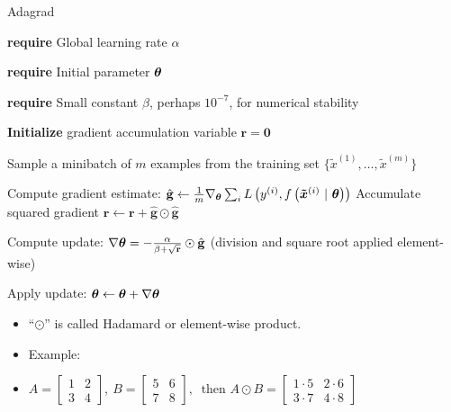 \documentclass[11pt,compress,t,notes=noshow, xcolor=table]{beamer}
\begin{document}
\begin{vbframe}{Adagrad}
	
	\begin{algorithm}[H]
		\small
		\caption{Adagrad}
		\begin{algorithmic}[1]
			\scriptsize 
			\State \textbf{require} Global learning rate $\alpha$ \strut
			\State \textbf{require} Initial parameter $\bm{\theta}$ \strut
			\State \textbf{require} Small constant $\beta$, perhaps $10^{-7}$, for numerical stability \strut
			\State \textbf{Initialize} gradient accumulation variable $\mathbf{r} = \mathbf{0} $
			\State \parbox[t]{\dimexpr\linewidth-\algorithmicindent}{Sample a minibatch of $m$ examples from the training set $\{\tilde{x}^{(1)},\dots,\tilde{x}^{(m)}\}$ \strut}
			\State Compute gradient estimate: $\hat{\mathbf{g}} \leftarrow \frac{1}{m} \nabla_{\bm{\theta}} \sum_{i} L\left(y^{(i)}, f\left(\bm{\tilde{x}}^{(i)} ~|~ \bm{\theta}\right)\right)$
			\State Accumulate squared gradient $\mathbf{r} \leftarrow \mathbf{r} + \hat{\mathbf{g}} \odot  \hat{\mathbf{g}}$
			\State \parbox[t]{\dimexpr\linewidth-\algorithmicindent}{Compute update: $\nabla \bm{\theta} = - \frac{\alpha}{\beta + \sqrt\mathbf{r}} \odot \hat{\mathbf{g}}$ (division and square root applied element-wise) \strut}
			\State Apply update: $\bm{\theta} \leftarrow \bm{\theta} + \nabla\bm{\theta}$
			\EndWhile
		\end{algorithmic}
	\end{algorithm}
	\begin{itemize}
		\small
		\item \enquote{$\odot$} is called Hadamard or element-wise product.
		\item Example:
		\vspace{0.2cm}
		\item[] $A =
		\begin{bmatrix}
		1 & 2 \\
		3 & 4
		\end{bmatrix}, \ 
		B =
		\begin{bmatrix}
		5 & 6 \\
		7 & 8
		\end{bmatrix}, \ \text{ then } A \odot B =
		\begin{bmatrix}
		1 \cdot 5 & 2 \cdot 6 \\
		3 \cdot 7 & 4 \cdot 8
		\end{bmatrix}$
	\end{itemize}
\end{vbframe}

\end{document}
